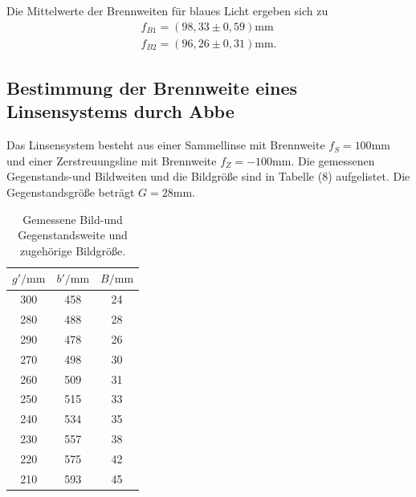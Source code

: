 Die Mittelwerte der Brennweiten für blaues Licht ergeben sich zu
\begin{align*}
f_{B1} = (98,33 \pm 0,59) \si{\milli\meter} \\
f_{B2} = (96,26 \pm 0,31) \si{\milli\meter} .
\end{align*}

\subsection{Bestimmung der Brennweite eines Linsensystems durch Abbe}
Das Linsensystem besteht aus einer Sammellinse mit Brennweite $f_S = 100 \si{\milli\meter}$ und einer Zerstreuungsline mit Brennweite $f_Z = - 100 \si{\milli\meter}$.
Die gemessenen Gegenstands-und Bildweiten und die Bildgröße sind in Tabelle (8) aufgelistet. Die Gegenstandsgröße beträgt $G = 28 \si{\milli\meter}$.

\begin{table}[H]
\centering
\caption{Gemessene Bild-und Gegenstandsweite und zugehörige Bildgröße.}
\label{tab:einzel1}
\begin{tabular}{c c c}
\toprule
$g'/\si{\milli\meter}$ & $b'/\si{\milli\meter}$ & $B/\si{\milli\meter}$\\
\midrule
300&	458&	24\\
280&	488&	28\\
290&	478&	26\\
270&	498&	30\\
260&	509&	31\\
250&	515&	33\\
240&	534&	35\\
230&	557&	38\\
220&	575&	42\\
210&	593&	45\\
\bottomrule
\end{tabular}
\end{table}

